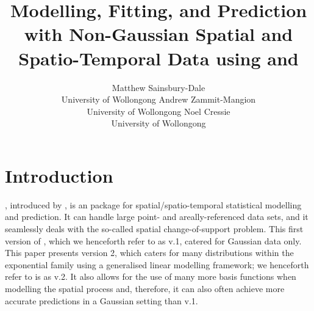 \documentclass[article]{jss}
\author{Matthew Sainsbury-Dale\\University of Wollongong
   \And \quad\quad Andrew Zammit-Mangion\\\quad\quad University of Wollongong 
   \And Noel Cressie\\University of Wollongong}
\title{Modelling, Fitting, and Prediction with Non-Gaussian Spatial and Spatio-Temporal Data using \pkg{TMB} and \pkg{FRK}}
\newcommand{\red}[1]{\textcolor{red}{#1}}
\begin{document}
\sloppy %





\section{Introduction}\label{sec:intro}



, introduced by \cite{FRK_paper}, is an  \citep{Rcoreteam_2020} package for spatial/spatio-temporal statistical modelling and prediction. It can handle large point- and areally-referenced data sets, and it seamlessly deals with the so-called spatial change-of-support problem. 
 This first version of , which we henceforth refer to as  v.1, catered for Gaussian data only.
 This paper presents version 2, which caters for many distributions within the exponential family using a generalised linear modelling framework; we henceforth refer to is as  v.2. It also allows for the use of many more basis functions when modelling the spatial process and, therefore, it can also often achieve more accurate predictions in a Gaussian setting than  v.1. 
\end{document}
